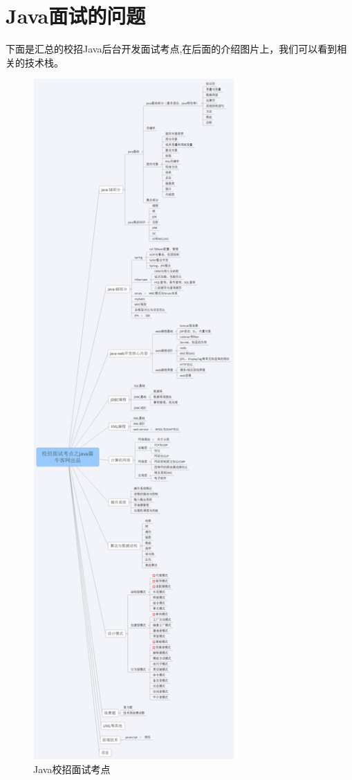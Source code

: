 \documentclass[UTF8]{ctexart}
\begin{document}
\section{Java面试的问题}
下面是汇总的校招Java后台开发面试考点,在后面的介绍图片上，我们可以看到相关的技术栈。
\begin{figure}[htbp]
\centering
\includegraphics[height=26cm,width=7.7cm]{Figure/Java.png}
\caption{Java校招面试考点}
\end{figure}
\end{document}
